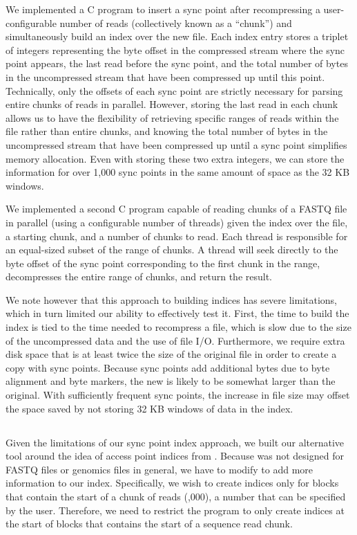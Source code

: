 We implemented a C program to insert a sync point after recompressing a user-configurable number of 
reads (collectively known as a ``chunk'') and simultaneously build an index over the new file. Each 
index entry stores a triplet of integers representing the byte offset in the compressed stream where 
the sync point appears, the last read before the sync point, and the total number of bytes in the 
uncompressed stream that have been compressed up until this point. Technically, only the offsets of 
each sync point are strictly necessary for parsing entire chunks of reads in parallel. However, storing 
the last read in each chunk allows us to have the flexibility of retrieving specific ranges of reads within 
the \gzip file rather than entire chunks, and knowing the total number of bytes in the uncompressed stream 
that have been compressed up until a sync point simplifies memory allocation. Even with storing these two
extra integers, we can store the information for over 1,000 sync points in the same amount of space as the
32 KB windows. 

We implemented a second C program capable of reading chunks of a \gzip FASTQ file in parallel (using a
configurable number of threads) given the index over the file, a starting chunk, and a number of chunks 
to read. Each thread is responsible for an equal-sized subset of the range of chunks. A thread will
seek directly to the byte offset of the sync point corresponding to the first chunk in the range, 
decompresses the entire range of chunks, and return the result.

We note however that this approach to building indices has severe limitations, which in turn
limited our ability to effectively test it. First, the time to build the index is tied to the
time needed to recompress a \gzip file, which is slow due to the size of the uncompressed data
and the use of file I/O. Furthermore, we require extra disk space that is at least twice the
size of the original \gzip file in order to create a copy with sync points. Because sync points
add additional bytes due to byte alignment and byte markers, the new \gzip is likely to be
somewhat larger than the original. With sufficiently frequent sync points, the increase in file
size may offset the space saved by not storing 32 KB windows of data in the index.

\subsection{\ibuilder}
\label{sec:ibuilder}
Given the limitations of our sync point index approach, we built our alternative \ibuilder 
tool around the idea of access point indices from \zran. Because \zran was not designed for 
FASTQ files or genomics files in general, we have to modify \zran to add more information to 
our index. Specifically, we wish to create indices only for \gzip blocks that contain the 
start of a chunk of reads (,000), a number that can be specified by the user. 
Therefore, we need to restrict the program to only create indices at the start of 
blocks that contains the start of a sequence read chunk.

